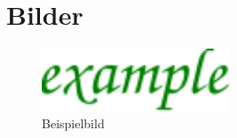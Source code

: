 \documentclass[a4paper, 10pt, fleqn]{article}
\begin{document}
    \section{Bilder}
    \begin{figure}[h!]
        \centering
        \includegraphics[width=0.5\textwidth] {../fig/example.pdf}
        \caption{Beispielbild}
        \label{fig:example}
    \end{figure}
\end{document}
